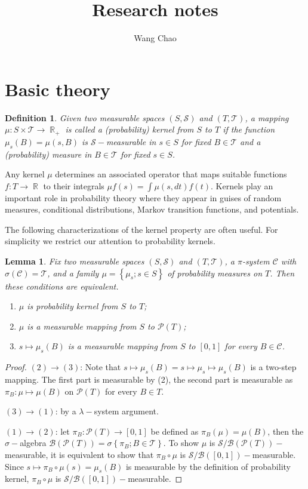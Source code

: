 \documentclass[12pt,a4paper]{article}
\author{Wang Chao}
\title{Research notes}
\newcommand{\R}{\mathop{\mathbb{R}}}
\def \B {\mathcal{B}}
\def \C {\mathcal{C}}
\def \P {\mathcal{P}}
\def \S {\mathcal{S}}
\def \T {\mathcal{T}}
\newtheorem{lemma}[theorem]{Lemma}
\newtheorem{definition}[theorem]{Definition}
\begin{document}
\maketitle
\tableofcontents
\newpage

\section{Basic theory}

\begin{definition}
  \label{def:kernel}
  Given two measurable spaces $(S,\S)$ and $(T,\T)$, a mapping $\mu :S\times \T \to \R_+$ is called a (probability) kernel from $S$ to $T$ if the function $\mu_s(B)=\mu(s,B)$ is $\S-$measurable in $s\in S$ for fixed $B\in\T$ and a (probability) measure in $B\in\T$ for fixed $s\in S$.
\end{definition}

Any kernel $\mu$ determines an associated operator that maps suitable functions $f:T\to\R$ to their integrals $\mu f(s) = \int \mu(s,dt)f(t)$. 
Kernels play an important role in probability theory where they appear in guises of random measures, conditional distributions, Markov transition functions, and potentials.

The following characterizations of the kernel property are often useful. For simplicity we restrict our attention to probability kernels.

\begin{lemma}
  Fix two measurable spaces $(S,\S)$ and $(T,\T)$, a $\pi$-system $\C$ with $\sigma(\C)=\T$, and a family $\mu=\left\{ \mu_s;s\in S \right\}$ of probability measures on $T$. Then these conditions are equivalent.
  \begin{enumerate}
    \item $\mu$ is probability kernel from $S$ to $T$;
    \item $\mu$ is a measurable mapping from $S$ to $\mathcal{P}(T)$;
      \item $s\mapsto \mu_s(B)$ is a measurable mapping from $S$ to $[0,1]$ for every $B\in \C$.
  \end{enumerate}

  \label{lem:kernel}
\end{lemma}
\begin{proof}
    $(2) \to (3)$: Note that $s\mapsto \mu_s(B) = s\mapsto \mu_s \mapsto \mu_s(B)$ is a two-step mapping. The first part is measurable by (2), the second part is measurable as $\pi_B:\mu\mapsto \mu(B)$ on $\P(T)$ for every $B\in T$.

    $(3)\to(1)$: by a $\lambda-$system argument.

    $(1)\to(2)$: let $\pi_B:\P(T)\to[0,1]$ be defined as $\pi_B(\mu) = \mu(B)$, then the $\sigma-$algebra $\B(\P(T))=\sigma\left\{ \pi_B;B\in \T \right\}$. To show $\mu$ is $\S/\B(\P(T))-$measurable, it is equivalent to show that $\pi_B\circ \mu$ is $\S/\B([0,1])-$measurable. Since $s\mapsto \pi_B\circ \mu(s)= \mu_s(B)$ is measurable by the definition of probability kernel, $\pi_B\circ \mu$ is $\S/\B([0,1])-$measurable.
\end{proof}
\end{document}
